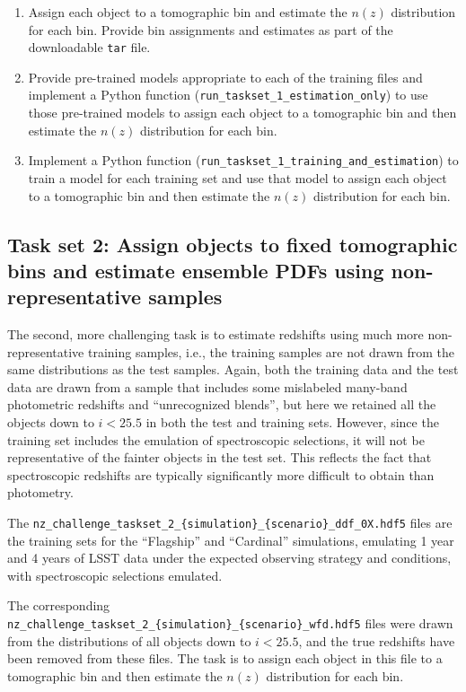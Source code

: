\documentclass[11pt,twoside,letterpaper,onecolumn,english]{article}
\begin{document}
\begin{enumerate}
  \item{Assign each object to a tomographic bin and estimate the $n(z)$ distribution for each bin.
      Provide bin assignments and estimates as part of the downloadable \texttt{tar} file.}
  \item{Provide pre-trained models appropriate to each of the training
      files and implement a Python function (\texttt{run\_taskset\_1\_estimation\_only}) to use those
      pre-trained models to assign each object to a tomographic bin and then estimate the $n(z)$
      distribution for each bin.}
  \item{Implement a Python function (\texttt{run\_taskset\_1\_training\_and\_estimation}) to train a model for
      each training set and use that model to assign each object to a tomographic bin and then estimate the $n(z)$
      distribution for each bin.}
\end{enumerate}


\subsection{Task set 2: Assign objects to fixed tomographic bins
  and estimate ensemble PDFs using non-representative
  samples}

The second, more challenging task is to estimate redshifts
using much more non-representative training samples, i.e., the training samples
are not drawn from the same distributions as the test samples.  Again, both the training
data and the test data are drawn from a sample that includes
some mislabeled many-band photometric redshifts and ``unrecognized blends'', but here
we retained all the objects down to $i < 25.5$ in both the test and training sets.
However, since the training set includes the emulation of spectroscopic selections, it will not be
representative of the fainter objects in the test set. This reflects the fact that spectroscopic redshifts
are typically significantly more difficult to obtain than photometry.

The
\texttt{nz\_challenge\_taskset\_2\_\{simulation\}\_\{scenario\}\_ddf\_0X.hdf5}
files are the training sets for the ``Flagship'' and ``Cardinal''
simulations, emulating 1 year and 4 years of LSST data under the
expected observing strategy and conditions, with spectroscopic
selections emulated.

The corresponding
\texttt{nz\_challenge\_taskset\_2\_\{simulation\}\_\{scenario\}\_wfd.hdf5}
files were \allowbreak drawn from the distributions of all objects down to $i <
25.5$, and the true redshifts have been removed from these files.
The task is to assign each object in this file to a tomographic bin and then estimate the $n(z)$ distribution for
each bin.
\end{document}
